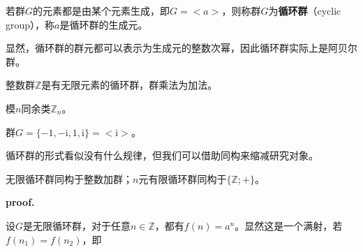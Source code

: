 
\begin{definition}{}
若群$G$的元素都是由某个元素生成，即$G=<a>$，则称群$G$为\textbf{循环群}（cyclic group），称$a$是循环群的生成元。
\end{definition}

显然，循环群的群元都可以表示为生成元的整数次幂，因此循环群实际上是阿贝尔群。
\begin{example}{}
整数群$\mathbb Z$是有无限元素的循环群，群乘法为加法。
\end{example}
\begin{example}{}
模$n$同余类$\mathbb Z_n$。
\end{example}
\begin{example}{}
群$G=\{-1,-\mathrm i,1,\mathrm i\}=<\mathrm i>$。
\end{example}
循环群的形式看似没有什么规律，但我们可以借助同构来缩减研究对象。
\begin{theorem}{}
无限循环群同构于整数加群；$n$元有限循环群同构于$\{\mathbb Z;+\}$。
\end{theorem}
\textbf{proof.}

设$G$是无限循环群，对于任意$n\in \mathbb Z$，都有$f(n)=a^n$。显然这是一个满射，若$f(n_1)=f(n_2)$，即